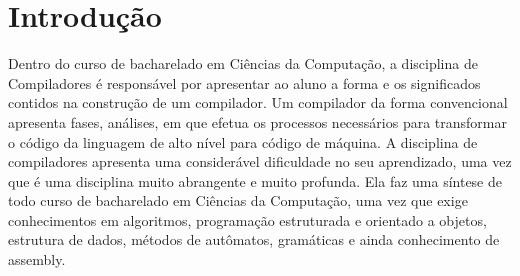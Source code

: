 \documentclass[12pt,oneside,a4paper,chapter=TITLE,section=TITLE,sumario=tradicional]{abntex2}
\begin{document}


\listadefiguras

\listadegraficos
\listadequadros

\sumario

\textual

\chapter{Introdução}
\label{cap:introducao}


Dentro do curso de bacharelado em Ciências da Computação, a disciplina de Compiladores é responsável por apresentar ao aluno a forma e os significados contidos na construção de um compilador. Um compilador da forma convencional apresenta fases, análises, em que efetua os processos necessários para transformar o código da linguagem de alto nível para código de máquina. A disciplina de compiladores apresenta uma considerável dificuldade no seu aprendizado, uma vez que é uma disciplina muito abrangente e muito profunda. Ela faz uma síntese de todo curso de bacharelado em Ciências da Computação, uma vez que exige conhecimentos em algoritmos, programação estruturada e orientado a objetos, estrutura de dados, métodos de autômatos, gramáticas e ainda conhecimento de assembly. 
\end{document}
